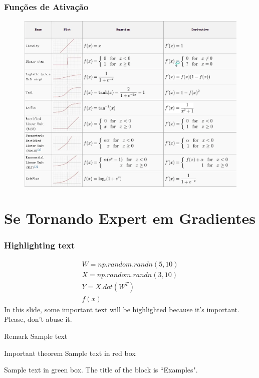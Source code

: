 \documentclass{beamer}
\begin{document}
\begin{frame}
	\frametitle{Funções de Ativação}
	\begin{figure}
		\centering
		\includegraphics[width=0.7\linewidth]{figures/mais_activation_functions}
		\caption{}
		\label{fig:maisactivationfunctions}
	\end{figure}

\end{frame}
\section{Se Tornando Expert em Gradientes}

\begin{frame}
\frametitle{Highlighting text}

\begin{gather}
	W = np.random.randn(5, 10) \\
	X = np.random.randn(3, 10) \\
	Y = X.dot(W^{T}) \\
	f(x)
\end{gather}
%
In this slide, some important text will be
\alert{highlighted} because it's important.
Please, don't abuse it.

\begin{block}{Remark}
Sample text
\end{block}

\begin{alertblock}{Important theorem}
Sample text in red box
\end{alertblock}

\begin{examples}
Sample text in green box. The title of the block is ``Examples".
\end{examples}
\end{frame}
\end{document}
